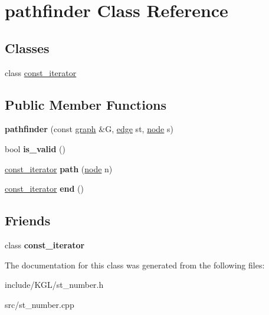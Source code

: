 \hypertarget{classpathfinder}{}\section{pathfinder Class Reference}
\label{classpathfinder}
\subsection*{Classes}
\begin{DoxyCompactItemize}
\item 
class \mbox{\hyperlink{classpathfinder_1_1const__iterator}{const\+\_\+iterator}}
\end{DoxyCompactItemize}
\subsection*{Public Member Functions}
\begin{DoxyCompactItemize}
\item 
\mbox{\label{classpathfinder_ac76b30da32ebf780bf42cdb6da2d2376}} 
{\bfseries pathfinder} (const \mbox{\hyperlink{classgraph}{graph}} \&G, \mbox{\hyperlink{classedge}{edge}} st, \mbox{\hyperlink{classnode}{node}} s)
\item 
\mbox{\label{classpathfinder_a3e595928f8f00bb7b9639f82684f8f05}} 
bool {\bfseries is\+\_\+valid} ()
\item 
\mbox{\label{classpathfinder_ab4fffc6da33fb6b1e6badf3a4b3cfed4}} 
\mbox{\hyperlink{classpathfinder_1_1const__iterator}{const\+\_\+iterator}} {\bfseries path} (\mbox{\hyperlink{classnode}{node}} n)
\item 
\mbox{\label{classpathfinder_a2421f20a6252a46fbc1955322b0f9c55}} 
\mbox{\hyperlink{classpathfinder_1_1const__iterator}{const\+\_\+iterator}} {\bfseries end} ()
\end{DoxyCompactItemize}
\subsection*{Friends}
\begin{DoxyCompactItemize}
\item 
\mbox{\label{classpathfinder_ac220ce1c155db1ac44146c12d178056f}} 
class {\bfseries const\+\_\+iterator}
\end{DoxyCompactItemize}


The documentation for this class was generated from the following files\+:\begin{DoxyCompactItemize}
\item 
include/\+K\+G\+L/st\+\_\+number.\+h\item 
src/st\+\_\+number.\+cpp\end{DoxyCompactItemize}
